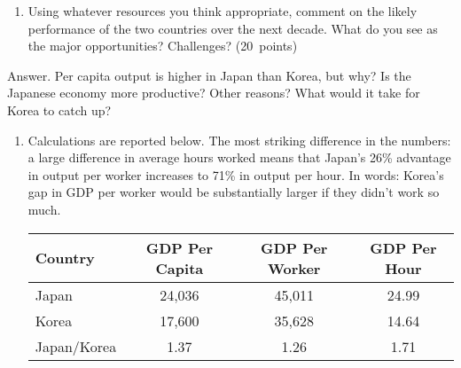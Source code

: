 \documentclass[letterpaper,12pt]{article}
\begin{document}
\begin{enumerate}
\begin{enumerate}
\item Using whatever resources you think appropriate, 
comment on the likely performance of the two countries over the next 
decade.  
What do you see as the major opportunities?  Challenges?  (20~points) 
\end{enumerate}


Answer.
Per capita output is higher in Japan than Korea, but why?
Is the Japanese economy more productive?  Other reasons?  
What would it take for Korea to catch up?  
\begin{enumerate}
\item Calculations are reported below.  
The most striking difference in the numbers:  
a large difference in average hours worked means 
that Japan's 26\% advantage in output per worker 
increases to 71\% in output per hour.  
In words:  Korea's gap in GDP per worker would be substantially 
larger if they didn't work so much.  
\begin{center}
\begin{tabular}{lccc}
\hline\hline
Country   &  GDP Per Capita &  GDP Per Worker &  GDP Per Hour \\
\hline\hline
Japan       &  24,036  & 45,011 &  24.99 \\
Korea       &  17,600  & 35,628 &  14.64 \\
Japan/Korea &  1.37 &  1.26 &  1.71 \\
\hline\hline
\end{tabular}
\end{center}


\end{enumerate}
\end{enumerate}
\end{document}
